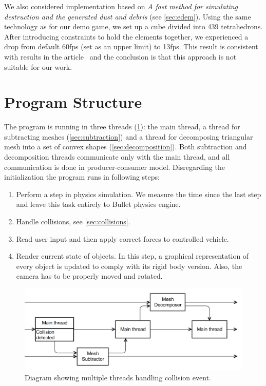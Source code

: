 We also considered implementation based on \emph{A fast method for simulating destruction and the generated dust and debris} (see \cref{sec:edem}). Using the same technology as for our demo game, we set up a cube divided into 439 tetrahedrons. After introducing constraints to hold the elements together, we experienced a drop from default 60fps (set as an upper limit) to 13fps. This result is consistent with results in the article~\cite{edem} and the conclusion is that this approach is not suitable for our work.


\section{Program Structure}
The program is running in three threads (\cref{fig:threads}): the main thread, a thread for subtracting meshes (\cref{sec:subtraction}) and a thread for decomposing triangular mesh into a set of convex shapes (\cref{sec:decomposition}). Both subtraction and decomposition threads communicate only with the main thread, and all communication is done in producer-consumer model. Disregarding the initialization the program runs in following steps:
\begin{enumerate}
\item Perform a step in physics simulation. We measure the time since the last step and leave this task entirely to Bullet physics engine.
\item Handle collisions, see \cref{sec:collisions}.
\item Read user input and then apply correct forces to controlled vehicle.
\item Render current state of objects. In this step, a graphical representation of every object is updated to comply with its rigid body version. Also, the camera has to be properly moved and rotated.
\end{enumerate}

\begin{figure}
        \centering
        \includegraphics[width=\textwidth]{img/decompositionFlow}
        \caption{Diagram showing multiple threads handling collision event. }
        \label{fig:threads}
\end{figure}



